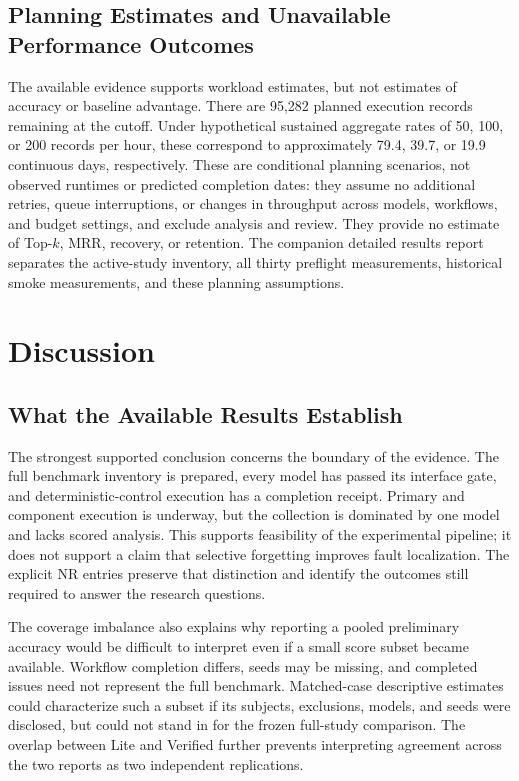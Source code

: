 \documentclass[letterpaper,journal]{IEEEtran}
\begin{document}
\subsection{Planning Estimates and Unavailable Performance Outcomes}
The available evidence supports workload estimates, but not estimates of accuracy or baseline advantage. There are 95,282 planned execution records remaining at the cutoff. Under hypothetical sustained aggregate rates of 50, 100, or 200 records per hour, these correspond to approximately 79.4, 39.7, or 19.9 continuous days, respectively. These are conditional planning scenarios, not observed runtimes or predicted completion dates: they assume no additional retries, queue interruptions, or changes in throughput across models, workflows, and budget settings, and exclude analysis and review. They provide no estimate of Top-$k$, MRR, recovery, or retention. The companion detailed results report separates the active-study inventory, all thirty preflight measurements, historical smoke measurements, and these planning assumptions.

\section{Discussion}\label{sec:discussion}
\subsection{What the Available Results Establish}
The strongest supported conclusion concerns the boundary of the evidence. The full benchmark inventory is prepared, every model has passed its interface gate, and deterministic-control execution has a completion receipt. Primary and component execution is underway, but the collection is dominated by one model and lacks scored analysis. This supports feasibility of the experimental pipeline; it does not support a claim that selective forgetting improves fault localization. The explicit NR entries preserve that distinction and identify the outcomes still required to answer the research questions.

The coverage imbalance also explains why reporting a pooled preliminary accuracy would be difficult to interpret even if a small score subset became available. Workflow completion differs, seeds may be missing, and completed issues need not represent the full benchmark. Matched-case descriptive estimates could characterize such a subset if its subjects, exclusions, models, and seeds were disclosed, but could not stand in for the frozen full-study comparison. The overlap between Lite and Verified further prevents interpreting agreement across the two reports as two independent replications.
\end{document}
